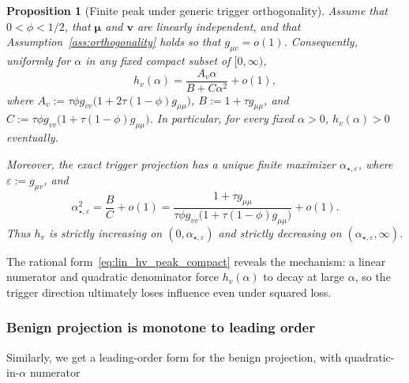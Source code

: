 \documentclass[11pt]{article}
\newcommand{\bv}{\mathbf{v}}
\newcommand{\bmu}{\boldsymbol{\mu}}
\newtheorem{proposition}[theorem]{Proposition}
\begin{document}
\begin{proposition}[Finite peak under generic trigger orthogonality]
\label{prop:lin_peak_general}
Assume that \(0<\phi<1/2\), that \(\bmu\) and \(\bv\) are linearly independent,
and that Assumption~\ref{ass:orthogonality} holds so that $g_{\mu v}=o(1)$.
Consequently, uniformly for \(\alpha\) in any fixed compact subset of
\([0,\infty)\),
\begin{equation}
\label{eq:lin_hv_peak_compact}
h_v(\alpha)
=
\frac{A_v\alpha}{B+C\alpha^2}
+o(1),
\end{equation}
where $A_v:=\tau\phi g_{vv}\bigl(1+2\tau(1-\phi)g_{\mu\mu}\bigr)$, $B:=1+\tau g_{\mu\mu}$, and $C:=\tau\phi g_{vv}\bigl(1+\tau(1-\phi)g_{\mu\mu}\bigr)$.
In particular, for every fixed \(\alpha>0\), \(h_v(\alpha)>0\) eventually.

Moreover, the exact trigger projection has a unique finite maximizer
\(\alpha_{\star,\varepsilon}\), where \(\varepsilon:=g_{\mu v}\), and
\begin{equation}
\label{eq:lin_alpha_star_compact}
\alpha_{\star,\varepsilon}^2
=
\frac{B}{C}
+o(1)
=
\frac{1+\tau g_{\mu\mu}}
{\tau\phi g_{vv}\bigl(1+\tau(1-\phi)g_{\mu\mu}\bigr)}
+o(1).
\end{equation}
Thus \(h_v\) is strictly increasing on
\((0,\alpha_{\star,\varepsilon})\) and strictly decreasing on
\((\alpha_{\star,\varepsilon},\infty)\).
\end{proposition}



The rational form~\eqref{eq:lin_hv_peak_compact} reveals the mechanism: a linear numerator and quadratic denominator force \(h_v(\alpha)\) to decay at large \(\alpha\), so the trigger direction ultimately loses influence even under squared loss.

\subsubsection{Benign projection is monotone to leading order}

Similarly, we get a leading-order form for the benign projection, with quadratic-in-$\alpha$ numerator
\end{document}
